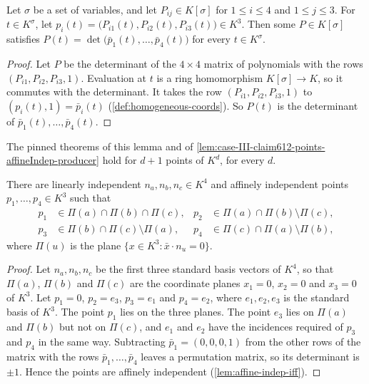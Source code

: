 \begin{lemma}
  \label{lem:case-III-claim612-detpoly}
  \leanok
  Let $\sigma$ be a set of variables, and let $P_{ij} \in K[\sigma]$ for
  $1 \le i \le 4$ and $1 \le j \le 3$. For $t \in K^\sigma$, let
  $p_i(t) = \bigl(P_{i1}(t), P_{i2}(t), P_{i3}(t)\bigr) \in K^3$. Then
  some $P \in K[\sigma]$ satisfies
  $P(t) = \det\bigl(\bar p_1(t), \dots, \bar p_4(t)\bigr)$ for every
  $t \in K^\sigma$.
\end{lemma}
\begin{proof}
  \leanok
  Let $P$ be the determinant of the $4 \times 4$ matrix of polynomials
  with the rows $(P_{i1}, P_{i2}, P_{i3}, 1)$. Evaluation at $t$ is a
  ring homomorphism $K[\sigma] \to K$, so it commutes with the
  determinant. It takes the row
  $(P_{i1}, P_{i2}, P_{i3}, 1)$ to $(p_i(t), 1) = \bar p_i(t)$
  (\cref{def:homogeneous-coords}). So $P(t)$ is the determinant of
  $\bar p_1(t), \dots, \bar p_4(t)$.
\end{proof}

\begin{fmlnote}
  The pinned theorems of this lemma and of
  \cref{lem:case-III-claim612-points-affineIndep-producer} hold for
  $d + 1$ points of $K^d$, for every $d$.
\end{fmlnote}

\begin{lemma}
  \label{lem:case-III-claim612-points-affineIndep}
  \leanok
  There are linearly independent $n_a, n_b, n_c \in K^4$ and affinely
  independent points $p_1, \dots, p_4 \in K^3$ such that
  \begin{align*}
    p_1 &\in \Pi(a) \cap \Pi(b) \cap \Pi(c), &
    p_2 &\in \Pi(a) \cap \Pi(b) \setminus \Pi(c), \\
    p_3 &\in \Pi(b) \cap \Pi(c) \setminus \Pi(a), &
    p_4 &\in \Pi(c) \cap \Pi(a) \setminus \Pi(b),
  \end{align*}
  where $\Pi(u)$ is the plane $\{x \in K^3 : \bar x \cdot n_u = 0\}$.
\end{lemma}
\begin{proof}
  \leanok
  Let $n_a, n_b, n_c$ be the first three standard basis vectors of
  $K^4$, so that $\Pi(a)$, $\Pi(b)$ and $\Pi(c)$ are the coordinate
  planes $x_1 = 0$, $x_2 = 0$ and $x_3 = 0$ of $K^3$. Let $p_1 = 0$,
  $p_2 = e_3$, $p_3 = e_1$ and $p_4 = e_2$, where $e_1, e_2, e_3$ is
  the standard basis of $K^3$. The point $p_1$ lies on the three
  planes. The point $e_3$ lies on $\Pi(a)$ and $\Pi(b)$ but not on
  $\Pi(c)$, and $e_1$ and $e_2$ have the incidences required of $p_3$
  and $p_4$ in the same way. Subtracting $\bar p_1 = (0, 0, 0, 1)$ from
  the other rows of the matrix with the rows
  $\bar p_1, \dots, \bar p_4$ leaves a permutation matrix, so its
  determinant is $\pm 1$. Hence the points are affinely independent
  (\cref{lem:affine-indep-iff}).
\end{proof}


